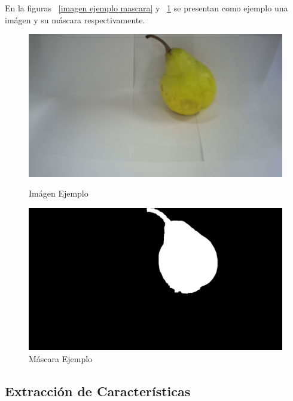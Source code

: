 \documentclass[a4paper, 12pt]{article}
\begin{document}
En la figuras ~\ref{imagen ejemplo mascara} y ~\ref{mascara ejemplo mascara} se presentan como ejemplo una imágen y su máscara respectivamente.
\begin{figure}[!htbp]
    \begin{minipage}[t]{0.5\textwidth}
        \centering
        \includegraphics[width=0.8\linewidth]{imagen_mascara.jpeg}
        \caption{Imágen Ejemplo}
        \label{imagen ejemplo mascara}
    \end{minipage}%
    \begin{minipage}[t]{0.5\textwidth}
        \centering
        \includegraphics[width=0.8\linewidth]{mascara_mascara.jpeg}
        \caption{Máscara Ejemplo}
        \label{mascara ejemplo mascara}
    \end{minipage}
\end{figure}

\subsection{Extracción de Características}
\end{document}

